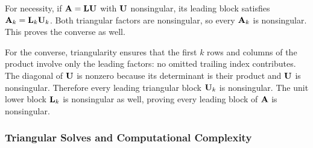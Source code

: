 \documentclass[../main.tex]{subfiles}
\begin{document}
{For necessity, if $\mathbf{A}=\mathbf{L}\mathbf{U}$ with $\mathbf{U}$ nonsingular, its leading block satisfies $\mathbf{A}_k=\mathbf{L}_k\mathbf{U}_k$. Both triangular factors are nonsingular, so every $\mathbf{A}_k$ is nonsingular. This proves the converse as well.


For the converse, triangularity ensures that the first $k$ rows and columns of the product involve only the leading factors: no omitted trailing index contributes. The diagonal of $\mathbf{U}$ is nonzero because its determinant is their product and $\mathbf{U}$ is nonsingular. Therefore every leading triangular block $\mathbf{U}_k$ is nonsingular. The unit lower block $\mathbf{L}_k$ is nonsingular as well, proving every leading block of $\mathbf{A}$ is nonsingular.
}

\subsubsection{Triangular Solves and Computational Complexity}

\label{def:triangular-solves}

\label{thm:lu-complexity}
\end{document}
